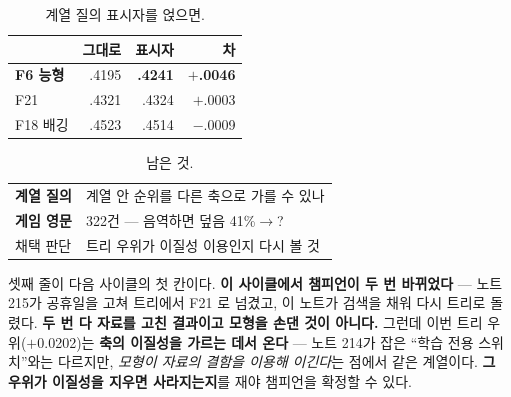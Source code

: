 \documentclass[10pt]{article}
\begin{document}

\begin{table}[t]
\centering\tsize
\caption{계열 질의 표시자를 얹으면.}
\begin{tabular}{lrrr}
\toprule
& 그대로 & 표시자 & 차 \\
\midrule
\textbf{F6 능형} & .4195 & \textbf{.4241} & \textbf{$+$.0046} \\
F21 & .4321 & .4324 & $+$.0003 \\
F18 배깅 & .4523 & .4514 & $-$.0009 \\
\bottomrule
\end{tabular}
\end{table}


\begin{table}[t]
\centering\tsize
\caption{남은 것.}
\begin{tabular}{ll}
\toprule
\textbf{계열 질의} & 계열 안 순위를 다른 축으로 가를 수 있나 \\
\textbf{게임 영문} & 322건 --- 음역하면 덮음 41\%$\to$? \\
채택 판단 & 트리 우위가 이질성 이용인지 다시 볼 것 \\
\bottomrule
\end{tabular}
\end{table}

셋째 줄이 다음 사이클의 첫 칸이다. \textbf{이 사이클에서 챔피언이 두 번
바뀌었다} --- 노트 215가 공휴일을 고쳐 트리에서 F21 로 넘겼고, 이 노트가
검색을 채워 다시 트리로 돌렸다. \textbf{두 번 다 자료를 고친 결과이고
모형을 손댄 것이 아니다.} 그런데 이번 트리 우위($+$0.0202)는
\textbf{축의 이질성을 가르는 데서 온다} --- 노트 214가 잡은 ``학습 전용
스위치''와는 다르지만, \emph{모형이 자료의 결함을 이용해 이긴다}는
점에서 같은 계열이다. \textbf{그 우위가 이질성을 지우면 사라지는지}를
재야 챔피언을 확정할 수 있다.
\end{document}
